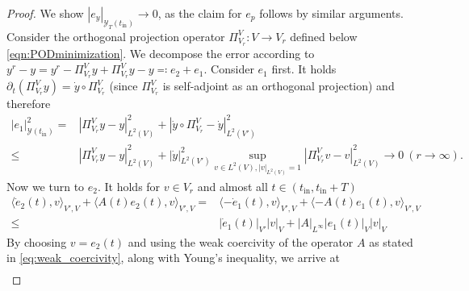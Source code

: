 \documentclass{m2an}
\newcommand{\ddt}{\partial_t}
\newcommand{\dt}{\mathrm{d}t}
\newcommand{\tint}{t_{\mathrm{in}}}
\newcommand{\mY}{{\mathscr Y}}
\newcommand{\norm}[2]{\left|#1\right|_{#2}}
\begin{document}
\begin{proof}
    We show $\norm{e_y}{\mY_T(\tint)}\to 0$, as the claim for $e_p$ follows by similar arguments. 
    Consider the orthogonal projection operator $\Pi^V_{V_r}:V\to V_r$ defined below \eqref{eqn:PODminimization}. We decompose the error according to $ y^r-y = y^r-\Pi^V_{V_r} y+\Pi^V_{V_r} y-y\eqqcolon e_2 + e_1$. Consider $e_1$ first. It holds $\ddt(\Pi^V_{V_r} y)= \dot y \circ \Pi^V_{V_r} $ (since $\Pi^V_{V_r}$ is self-adjoint as an orthogonal projection) and therefore
    \begin{align*}
        \norm{e_1}{\mY(\tint)}^2=&\norm{\Pi^V_{V_r} y-y}{L^2(V)}^2+\norm{\dot y \circ \Pi^V_{V_r} -\dot y}{L^2(V')}^2\\
        \leq &  \norm{\Pi^V_{V_r} y-y}{L^2(V)}^2+\norm{\dot y}{L^2(V')}^2\sup_{v\in L^2(V), \norm{v}{L^2(V)}=1}\norm{\Pi^V_{V_r}v-v}{L^2(V)}^2\to 0 \ (r\to \infty).
    \end{align*}
    Now we turn to $e_2$. It holds for $v\in V_r$ and almost all $t\in (\tint,\tint+T)$
    \begin{align}\label{eq:theo:galerkin_conv_help0}
        \langle\dot e_2(t),v\rangle_{V',V}+\langle A(t)e_2(t), v\rangle_{V',V}=& \langle-\dot e_1(t),v\rangle_{V',V}+\langle -A(t)e_1(t), v\rangle_{V',V}\\ \nonumber
        \leq & \norm{\dot e_1(t)}{V'}\norm{v}{V}+\norm{A}{L^\infty}\norm{e_1(t)}{V}\norm{v}{V}
    \end{align}
    By choosing $v=e_2(t)$ and using the weak coercivity of the operator $A$ as stated in \eqref{eq:weak_coercivity}, along with Young's inequality, we arrive at
    \begin{align}\label{eq:theo:galerkin_conv_help1}

\end{align}
\end{proof}
\end{document}
